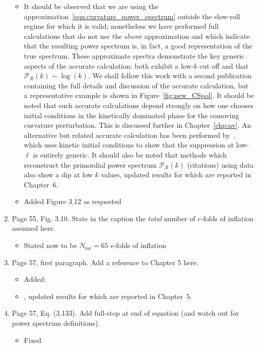 \documentclass[11pt]{article}
\begin{document}
\begin{enumerate}
\begin{itemize}
      \item It should be observed that we are using the approximation~\eqref{eqn:curvature_power_spectrum} outside the slow-roll regime for which it is valid; nonetheless we have performed full calculations that do not use the above approximation and which indicate that the resulting power spectrum is, in fact, a good representation of the true spectrum. These approximate spectra demonstrate the key generic aspects of the accurate calculation: both exhibit a low-\(k\) cut off and that \(\mathcal{P}_\mathcal{R}(k) \sim \log(k)\).  We shall follow this work with a second publication containing the full details and discussion of the accurate calculation, but a representative example is shown in Figure~\ref{fig:new_CSpol}. It should be noted that such accurate calculations depend strongly on how one chooses initial conditions in the kinetically dominated phase for the comoving curvature perturbation. This is discussed further in Chapter~\ref{chp:qv}. An alternative but related accurate calculation has been performed by~\cite{Lello_tensor_2013}, which uses kinetic initial conditions to show that the suppression at low-\(\ell\) is entirely generic. It should also be noted that methods which reconstruct the primordial power spectrum \(\mathcal{P}_\mathcal{R}(k)\) (citations) using data also show a dip at low \(k\) values, updated results for which are reported in Chapter~6.
      \item Added Figure 3.12 as requested
  \end{itemize}
\item Page 55, Fig. 3.10. State in the caption the \emph{total} number
  of $e$-folds of inflation assumed here.
  \begin{itemize}
    \item Stated now to be $N_\mathrm{tot}=65$ e-folds of inflation
  \end{itemize}
\item Page 57, first paragraph. Add a reference to Chapter 5 here.
  \begin{itemize}
    \item Added:
    \item , updated results for which are reported in Chapter~5.
  \end{itemize}
\item Page 57, Eq. (3.133). Add full-stop at end of equation (and
  watch out for power spectrum definitions).
  \begin{itemize}
    \item Fixed
  \end{itemize}

\end{enumerate}
\end{document}
